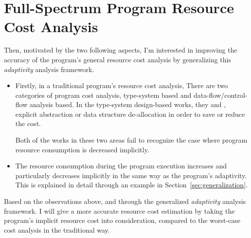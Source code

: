 \section{Full-Spectrum Program Resource Cost Analysis}
\label{sec:intro-cost}
Then, motivated by the two following aspects, I'm interested in improving the accuracy of the program's general resource cost analysis
by generalizing this \emph{adaptivity} analysis framework.
\begin{itemize}
 \item Firstly, in a traditional program's resource cost analysis,
 There are two categories of program cost analysis, type-system based and data-flow/control-flow analysis based. 
 In the type-system design-based works, they \cite{GustafssonEL05} and \cite{hoffmann_jost_2022}, explicit abstraction or data structure de-allocation in order to save or reduce the cost.
 
 Both of the
 works in these two areas fail to recognize the case where program resource consumption is decreased implicitly.
 \item The resource consumption during the program 
 execution increases and particularly decreases implicitly in the same way as the program's adaptivity. This is explained in detail through an example in Section~\ref*{sec:generalization}.
\end{itemize}
 Based on the observations above, and through the generalized \emph{adaptivity} analysis framework.
 I will give
 a more accurate resource cost estimation by taking the program's implicit resource cost into consideration, compared 
 to the worst-case cost analysis in the traditional way.
